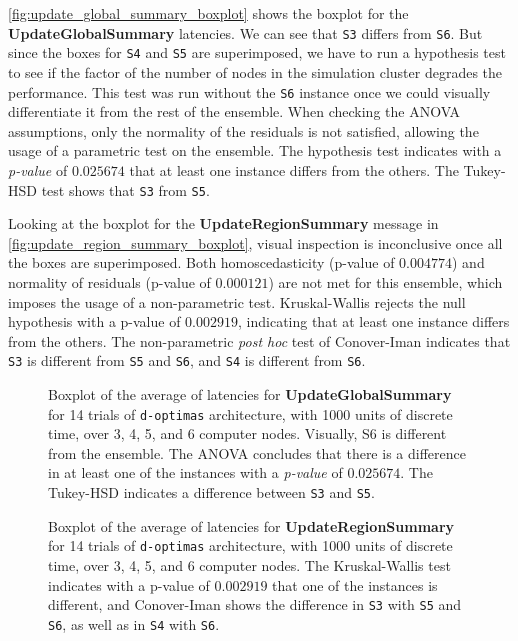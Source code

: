 \documentclass[preprint,12pt]{elsarticle}
\begin{document}
\autoref{fig:update_global_summary_boxplot} shows the boxplot for the \textbf{UpdateGlobalSummary} latencies. We can see that \texttt{S3} differs from \texttt{S6}. But since the boxes for \texttt{S4} and \texttt{S5} are superimposed, we have to run a hypothesis test to see if the factor of the number of nodes in the simulation cluster degrades the performance. This test was run without the \texttt{S6} instance once we could visually differentiate it from the rest of the ensemble. When checking the ANOVA assumptions, only the normality of the residuals is not satisfied, allowing the usage of a parametric test on the ensemble. The hypothesis test indicates with a \textit{p-value} of $0.025674$ that at least one instance differs from the others. The Tukey-HSD test shows that \texttt{S3} from \texttt{S5}.


Looking at the boxplot for the \textbf{UpdateRegionSummary} message in \autoref{fig:update_region_summary_boxplot}, visual inspection is inconclusive once all the boxes are superimposed. Both homoscedasticity (p-value of $0.004774$) and normality of residuals (p-value of $0.000121$) are not met for this ensemble, which imposes the usage of a non-parametric test. Kruskal-Wallis rejects the null hypothesis with a p-value of $0.002919$, indicating that at least one instance differs from the others. The non-parametric \textit{post hoc} test of Conover-Iman indicates that \texttt{S3} is different from \texttt{S5} and \texttt{S6}, and \texttt{S4} is different from \texttt{S6}.

\begin{figure}[ht!]
    \centering
    
    \caption{Boxplot of the average of latencies for \textbf{UpdateGlobalSummary} for 14 trials of \texttt{d-optimas} architecture, with 1000 units of discrete time, over 3, 4, 5, and 6 computer nodes. Visually, S6 is different from the ensemble. The ANOVA concludes that there is a difference in at least one of the instances with a \textit{p-value} of $0.025674$. The Tukey-HSD indicates a difference between \texttt{S3} and \texttt{S5}.}
    \label{fig:update_global_summary_boxplot}
\end{figure}

\begin{figure}[ht!]
    \centering
    
    \caption{Boxplot of the average of latencies for \textbf{UpdateRegionSummary} for 14 trials of \texttt{d-optimas} architecture, with 1000 units of discrete time, over 3, 4, 5, and 6 computer nodes. The Kruskal-Wallis test indicates with a p-value of $0.002919$ that one of the instances is different, and Conover-Iman shows the difference in \texttt{S3} with \texttt{S5} and \texttt{S6}, as well as in \texttt{S4} with \texttt{S6}.}
    \label{fig:update_region_summary_boxplot}
\end{figure}
\end{document}
